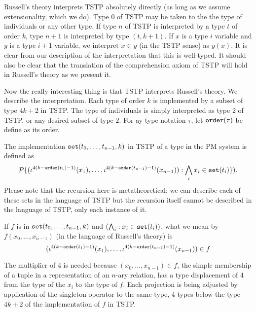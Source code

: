 \documentclass[12pt]{article}
\begin{document}
Russell's theory interprets TSTP absolutely directly (as long as we assume extensionality, which we do).  Type 0 of TSTP may be taken to the the type of individuals or any other type.  If type $n$ of TSTP is interpreted by a type $t$ of order $k$,
type $n+1$ is interpreted by type $(t,k+1)$.  If $x$ is a type $i$ variable and $y$ is a type $i+1$ variable,
we interpret $x\in y$ (in the TSTP sense) as $y(x)$.  It is clear from our description of the interpretation that this is well-typed.  It should also be clear that the translation of the comprehension axiom of TSTP will hold in Russell's theory as we present it.

Now the really interesting thing is that TSTP interprets Russell's theory.  We describe the interpretation.
	Each type of order $k$ is implemented by a subset of type $4k+2$ in TSTP.  The type of individuals is simply interpreted as type 2 of TSTP, or any desired subset of type 2.  For ay type notation $\tau$, let ${\tt order}(\tau)$ be define as its order.

The implementation ${\tt set}(t_0,\ldots,t_{n-1},k)$ in TSTP of a type in the PM system is defined as $${\cal P}\{(\iota^{4(k-{\tt order}(t_1)-1)}(x_1),\ldots,\iota^{4(k-{\tt order}(t_{n-1})-1)}(x_{n-1})):\bigwedge_i x_i \in {\tt set}(t_i)\}).$$  Please note that the recursion here is metatheoretical:  we can describe each of these sets in the language of TSTP but the recursion itself cannot be described in the language of TSTP, only each instance of it.

If $f$ is in ${\tt set}(t_0,\ldots,t_{n-1},k)$ and $(\bigwedge_i:x_i \in {\tt set}(t_i))$, what we mean by
$f(x_0,\ldots,x_{n-1})$ (in the language of Russell's theory) is $$(\iota^{4(k-{\tt order}(t_1)-1)}(x_1),\ldots,\iota^{4(k-{\tt order}(t_{n-1})-1)}(x_{n-1})) \in f$$

The multiplier of 4 is needed because $(x_0,\ldots,x_{n-1})\in f$, the simple membership of a tuple in a representation of an $n$-ary relation, has a type displacement of 4 from the type of the $x_i$ to the type of $f$.  Each projection is being adjusted by application of the singleton operator to the same type, 4 types below the type $4k+2$ of the implementation of $f$ in TSTP.
\end{document}

